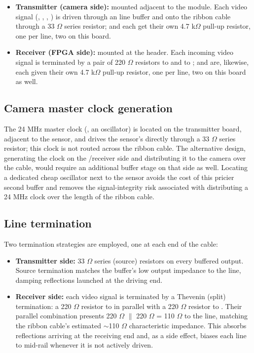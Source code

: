 \begin{itemize}
    \item \textbf{Transmitter (camera side):} mounted adjacent to the  module. Each video signal (, , , ) is driven through an  line buffer and onto the ribbon cable through a 33 $\Omega$ series resistor;  and  each get their own 4.7 k$\Omega$ pull-up resistor, one per line, two on this board.
    \item \textbf{Receiver (FPGA side):} mounted at the   header. Each incoming video signal is terminated by a pair of 220 $\Omega$ resistors to  and to ;  and  are, likewise, each given their own 4.7 k$\Omega$ pull-up resistor, one per line, two on this board as well.
\end{itemize}

\subsection{Camera master clock generation}
\label{subsec:camera-master-clock}

The 24 MHz master clock (, an   oscillator) is located on the transmitter board, adjacent to the sensor, and drives the sensor's  directly through a 33 $\Omega$ series resistor; this clock is not routed across the ribbon cable. The alternative design, generating the clock on the /receiver side and distributing it to the camera over the cable, would require an additional buffer stage on that side as well. Locating a dedicated cheap oscillator next to the sensor avoids the cost of this pricier second buffer and removes the signal-integrity risk associated with distributing a 24 MHz clock over the length of the ribbon cable.

\subsection{Line termination}

Two termination strategies are employed, one at each end of the cable:

\begin{itemize}
    \item \textbf{Transmitter side:} 33 $\Omega$ series (source) resistors on every buffered output. Source termination matches the buffer's low output impedance to the line, damping reflections launched at the driving end.
    \item \textbf{Receiver side:} each video signal is terminated by a Thevenin (split) termination: a 220 $\Omega$ resistor to  in parallel with a 220 $\Omega$ resistor to . Their parallel combination presents 220 $\Omega$ $\parallel$ 220 $\Omega$ = 110 $\Omega$ to the line, matching the ribbon cable's estimated $\sim$110 $\Omega$ characteristic impedance. This absorbs reflections arriving at the receiving end and, as a side effect, biases each line to mid-rail whenever it is not actively driven.
\end{itemize}

